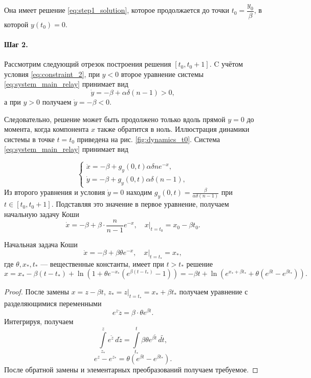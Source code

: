 Она имеет решение \eqref{eq:step1_solution}, которое продолжается до точки $t_0 = \dfrac{y_0}{\beta}$, в которой $y(t_0) = 0$.

\paragraph{Шаг 2.} Рассмотрим следующий отрезок построения решения $[t_0, t_0 + 1]$. C учётом условия \eqref{eq:constraint_2}, при $y < 0$ второе уравнение системы \eqref{eq:system_main_relay} принимает вид
\[
\dot{y} = -\beta + \alpha \delta (n - 1) > 0,
\]
а при $y > 0$ получаем $\dot{y} = -\beta < 0$.

Следовательно, решение может быть продолжено только вдоль прямой $y = 0$ до момента, когда компонента $x$ также обратится в ноль. Иллюстрация динамики системы в точке $t= t_0$ приведена на рис. \ref{fig:dynamics_t0}. Система \eqref{eq:system_main_relay} принимает вид

\begin{equation}
	\label{eq:step2_system}
	\begin{cases}
		\dot{x} = -\beta + g_y(0, t) \alpha \delta n e^{-x},\\
		\dot{y} = -\beta + g_y(0, t) \alpha \delta (n - 1),
	\end{cases}
\end{equation}
%
Из второго уравнения и условия $\dot{y} = 0$ находим $g_y(0, t) = \frac{\beta}{\alpha \delta (n - 1)}$ при $t \in [t_0, t_0 + 1]$. Подставляя это значение в первое уравнение, получаем начальную задачу Коши
\begin{equation}
	\label{eq:step2_start}
	\dot{x} = -\beta + \beta\cdot\dfrac{n}{n - 1}e^{-x}, \quad x|_{t = t_0} = x_0 - \beta t_0.
\end{equation}

\begin{lemma}
	\label{lm:default_equation}
	Начальная задача Коши 
	\[
	\dot{x} = -\beta + \beta \theta e^{-x}, \quad x \vert_{t = t_*} = x_*,
	\]
	где $\theta, x_*, t_*$ --- вещественные константы, имеет при $t > t_*$ решение 
	\[
	x = x_* - \beta (t - t_*) + \ln\left(1 + \theta e^{-x_*} (e^{\beta(t - t_*)} - 1)\right) =
	-\beta t + \ln\left(e^{x_* + \beta t_*} + \theta (e^{\beta t} - e^{\beta t_*})\right).
	\]
\end{lemma}

\begin{proof}
	После замены $x = z - \beta t$, $z_* = z \vert_{t = t_*} = x_* + \beta t_*$ получаем уравнение с разделяющимися переменными
	\[
	e^{z} \dot{z} = \beta \cdot \theta e^{\beta t}.
	\]
	Интегрируя, получаем
	\[
	\int\limits_{z_*}^z e^{\tilde{z}} \, d\tilde{z} = \int\limits_{t_*}^{t} \beta \theta e^{\beta \tilde{t}}\,d\tilde{t},
	\]
	\[
	e^z - e^{z_*} = \theta (e^{\beta t} - e^{\beta t_*}).
	\]
	После обратной замены и элементарных преобразований получаем требуемое.
\end{proof}


